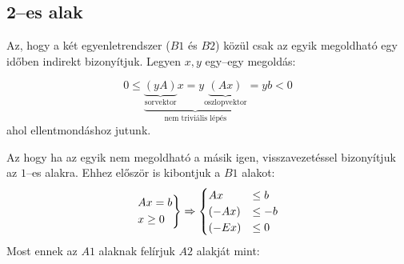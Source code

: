 \subsection{2--es alak}

Az, hogy a két egyenletrendszer ($B1$ és $B2$) közül csak az egyik megoldható
egy időben indirekt bizonyítjuk. Legyen $x,y$ egy--egy megoldás:

\[ 0 \leq \underbrace{
		\underbrace{(yA)}_{\mbox{sorvektor}}x =
		y\underbrace{(Ax)}_{\mbox{oszlopvektor}}}
	_{\mbox{nem triviális lépés}}=yb<0\] ahol ellentmondáshoz jutunk.

Az hogy ha az egyik nem megoldható a másik igen, visszavezetéssel bizonyítjuk az
$1$--es alakra. Ehhez először is kibontjuk a $B1$ alakot:
\[
	\begin{rcases}
		Ax =b \\
		x \geq 0
	\end{rcases} \Rightarrow
	\begin{cases}
		A x    & \leq b  \\
		(-A x) & \leq -b \\
		(-E x) & \leq 0
	\end{cases}
\]
Most ennek az $A1$ alaknak felírjuk $A2$ alakját mint:

